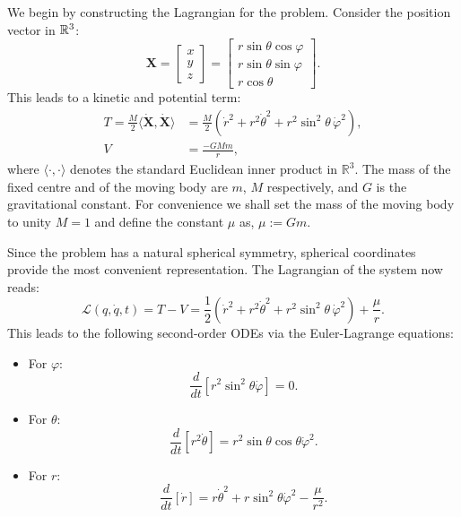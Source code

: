 \documentclass[12pt,oneside]{report}
\theoremstyle{definition}
\begin{document}
We begin by constructing the Lagrangian for the problem. Consider the position vector in $\mathbb{R}^{3}$:
\[
    \textbf{X} = 
    \begin{bmatrix}
           x \\
           y \\
           z
         \end{bmatrix} 
         = \begin{bmatrix}
           r\sin{\theta} \cos{\varphi} \\
           r\sin{\theta} \sin{\varphi} \\
           r\cos{\theta}
         \end{bmatrix}.
\]
This leads to a kinetic and potential term:
\begin{align*}
T = \frac{M}{2} \langle {\dot{\textbf{X}}},{\dot{\textbf{X}}} \rangle &= \frac{M}{2} (\dot{r}^2 + r^2 \dot{\theta}^2 + r^2 \sin^2{\theta}\, \dot{\varphi}^2), \\ V &= \frac{-GMm}{r},
\end{align*}
where \(\langle \cdot , \cdot \rangle\) denotes the standard Euclidean inner product in \(\mathbb{R}^3\). The mass  of the fixed centre and of the moving body are $m$, $M$ respectively, and $G$ is the gravitational constant. For convenience we shall set the mass of the moving body to unity $M= 1$ and define the constant $\mu$ as, $\mu := Gm$.   


Since the problem has a natural spherical symmetry, spherical coordinates provide the most convenient representation. The Lagrangian of the system now reads:
\begin{equation}\label{2.1}
\mathcal{L}(q,\dot{q},t) = T-V = \frac{1}{2} (\dot{r}^2 + r^2 \dot{\theta}^2 + r^2 \sin^2{\theta}\, \dot{\varphi}^2) + \frac{\mu }{r}.
\end{equation}
This leads to the following second-order ODEs via the Euler-Lagrange equations:
\begin{itemize}
    \item For \( \varphi \):
    \begin{equation}\label{2.2}
      \frac{d}{dt} \left[  r^2 \sin^2{\theta} \dot{\varphi} \right] = 0.
    \end{equation}
      
    
    \item For \( \theta \):
    \begin{equation}\label{2.3}
        \frac{d}{dt} \left[ r^2 \dot{\theta} \right] = r^2 \sin{\theta} \cos{\theta} \dot{\varphi}^2.
    \end{equation}
    \item For \( r \):
    \begin{equation}\label{2.4}
        \frac{d}{dt} \left[ \dot{r} \right] = r \dot{\theta}^2 + r \sin^2{\theta} \dot{\varphi}^2 - \frac{\mu}{r^2}.
    \end{equation}
\end{itemize}
\end{document}
